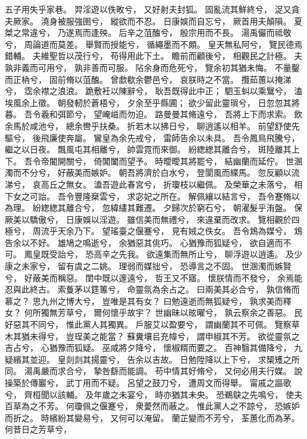 \begin{pinyinscope}
五子用失乎家巷。
羿淫遊以佚畋兮，
又好射夫封狐。
固亂流其鮮終兮，
浞又貪夫厥家。
澆身被服強圉兮，
縱欲而不忍。
日康娛而自忘兮，
厥首用夫顛隕。
夏桀之常違兮，
乃遂焉而逢殃。
后辛之菹醢兮，
殷宗用而不長。
湯禹儼而祗敬兮，
周論道而莫差。
舉賢而授能兮，
循繩墨而不頗。
皇天無私阿兮，
覽民德焉錯輔。
夫維聖哲以茂行兮，
苟得用此下土。
瞻前而顧後兮，
相觀民之計極。
夫孰非義而可用兮，
孰非善而可服。
阽余身而危死兮，
覽余初其猶未悔。
不量鑿而正枘兮，
固前脩以菹醢。
曾歔欷余鬱邑兮，
哀朕時之不當。
攬茹蕙以掩涕兮，
霑余襟之浪浪。
跪敷衽以陳辭兮，
耿吾既得此中正；
駟玉虯以乘鷖兮，
溘埃風余上徵。
朝發軔於蒼梧兮，
夕余至乎縣圃；
欲少留此靈瑣兮，
日忽忽其將暮。
吾令羲和弭節兮，
望崦嵫而勿迫。
路曼曼其脩遠兮，
吾將上下而求索。
飲余馬於咸池兮，
總余轡乎扶桑。
折若木以拂日兮，
聊逍遙以相羊。
前望舒使先驅兮，
後飛廉使奔屬。
鸞皇為余先戒兮，
雷師告余以未具。
吾令鳳鳥飛騰兮，
繼之以日夜。
飄風屯其相離兮，
帥雲霓而來御。
紛緫緫其離合兮，
斑陸離其上下。
吾令帝閽開關兮，
倚閶闔而望予。
時曖曖其將罷兮，
結幽蘭而延佇。
世溷濁而不分兮，
好蔽美而嫉妒。
朝吾將濟於白水兮，
登閬風而緤馬。
忽反顧以流涕兮，
哀高丘之無女。
溘吾遊此春宮兮，
折瓊枝以繼佩。
及榮華之未落兮，
相下女之可詒。
吾令豐隆椉雲兮，
求宓妃之所在。
解佩纕以結言兮，
吾令蹇脩以為理。
紛緫緫其離合兮，
忽緯繣其難遷。
夕歸次於窮石兮，
朝濯髮乎洧盤。
保厥美以驕傲兮，
日康娛以淫遊。
雖信美而無禮兮，
來違棄而改求。
覽相觀於四極兮，
周流乎天余乃下。
望瑤臺之偃蹇兮，
見有娀之佚女。
吾令鴆為媒兮，
鴆告余以不好。
雄鳩之鳴逝兮，
余猶惡其佻巧。
心猶豫而狐疑兮，
欲自適而不可。
鳳皇既受詒兮，
恐高辛之先我。
欲遠集而無所止兮，
聊浮遊以逍遙。
及少康之未家兮，
留有虞之二姚。
理弱而媒拙兮，
恐導言之不固。
世溷濁而嫉賢兮，
好蔽美而稱惡。
閨中既以邃遠兮，
哲王又不寤。
懷朕情而不發兮，
余焉能忍與此終古。
索藑茅以筳篿兮，
命靈氛為余占之。
曰兩美其必合兮，
孰信脩而慕之？
思九州之博大兮，
豈唯是其有女？
曰勉遠逝而無狐疑兮，
孰求美而釋女？
何所獨無芳草兮，
爾何懷乎故宇？
世幽昧以昡曜兮，
孰云察余之善惡。
民好惡其不同兮，
惟此黨人其獨異。
戶服艾以盈要兮，
謂幽蘭其不可佩。
覽察草木其猶未得兮，
豈珵美之能當？
蘇糞壤㠯充幃兮，
謂申椒其不芳。
欲從靈氛之吉占兮，
心猶豫而狐疑。
巫咸將夕降兮，
懷椒糈而要之。
百神翳其備降兮，
九疑繽其並迎。
皇剡剡其揚靈兮，
告余以吉故。
日勉陞降以上下兮，
求榘矱之所同。
湯禹嚴而求合兮，
摯咎繇而能調。
苟中情其好脩兮，
又何必用夫行媒。
說操築於傳巖兮，
武丁用而不疑。
呂望之鼓刀兮，
遭周文而得舉。
甯戚之謳歌兮，
齊桓聞以該輔。
及年歲之未宴兮，
時亦猶其未央。
恐鵜鴃之先鳴兮，
使夫百草為之不芳。
何瓊佩之偃蹇兮，
衆薆然而蔽之。
惟此黨人之不諒兮，
恐嫉妒而折之。
時繽紛其變易兮，
又何可以淹留。
蘭芷變而不芳兮，
荃蕙化而為茅。
何昔日之芳草兮，

\end{pinyinscope}
